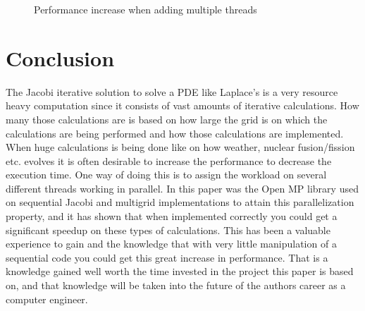 \documentclass{article}
\begin{document}
\begin{figure}
\hspace{4em}
\caption{Performance increase when adding multiple threads}
\end{figure}


\section{Conclusion}\label{conclusion}

The Jacobi iterative solution to solve a PDE like Laplace’s is a very resource heavy computation since it consists of vast amounts of iterative calculations. How many those calculations are is based on how large the grid is on which the calculations are being performed and how those calculations are implemented. When huge calculations is being done like on how weather, nuclear fusion/fission etc. evolves it is often desirable to increase the performance to decrease the execution time. One way of doing this is to assign the workload on several different threads working in parallel. In this paper was the Open MP library used on sequential Jacobi and multigrid implementations to attain this parallelization property, and it has shown that when implemented correctly you could get a significant speedup on these types of calculations. This has been a valuable experience to gain and the knowledge that with very little manipulation of a sequential code you could get this great increase in performance. That is a knowledge gained well worth the time invested in the project this paper is based on, and that knowledge will be taken into the future of the authors career as a computer engineer. 
\end{document}
